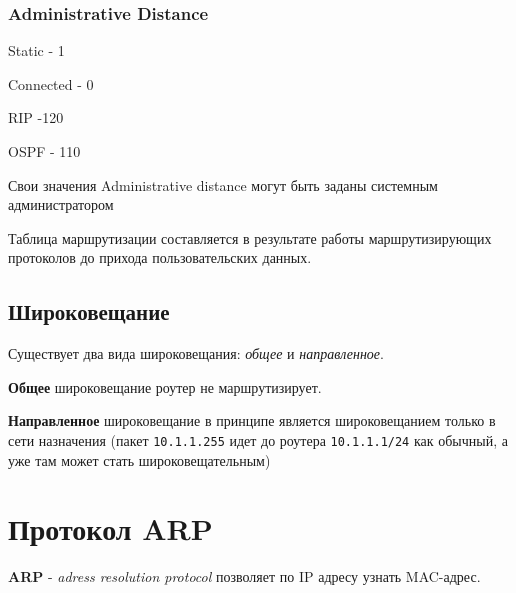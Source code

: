 \documentclass[a4paper,10pt]{article}
\begin{document}
	\subsubsection{Administrative Distance}
	
	Static - 1
	
	Connected - 0
	
	RIP -120
	
	OSPF - 110
	
	Свои значения Administrative distance могут быть заданы системным администратором
	
	Таблица маршрутизации составляется в результате работы маршрутизирующих протоколов до прихода пользовательских данных.
	
	\subsection{Широковещание}
	
	Существует два вида широковещания: \emph{общее} и \emph{направленное}.
	
	\textbf{Общее} широковещание роутер не маршрутизирует.
	
	\textbf{Направленное} широковещание в принципе является широковещанием только в сети назначения (пакет \texttt{10.1.1.255} идет до роутера \texttt{10.1.1.1/24} как обычный, а уже там может стать широковещательным)
	\newpage
	\section{Протокол ARP}
	\textbf{ARP} - \emph{adress resolution protocol} позволяет по IP адресу узнать MAC-адрес.
	
\end{document}

